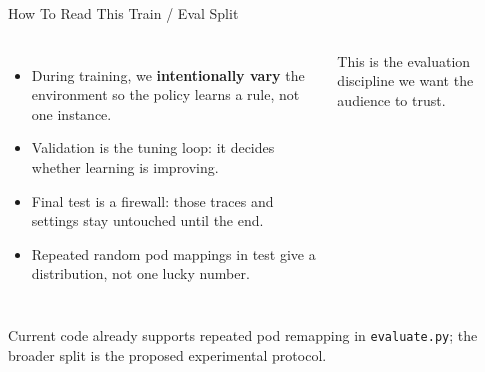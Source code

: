 \documentclass[10pt,aspectratio=169]{beamer}
\begin{document}
\begin{frame}{How To Read This Train / Eval Split}
  \begin{columns}[T,onlytextwidth]
      \centering
      \begin{itemize}
        \item During training, we \textbf{intentionally vary} the environment so the policy learns a rule, not one instance.
        \item Validation is the tuning loop: it decides whether learning is improving.
        \item Final test is a firewall: those traces and settings stay untouched until the end.
        \item Repeated random pod mappings in test give a distribution, not one lucky number.
      \end{itemize}

      \vspace{0.4em}
      {\scriptsize This is the evaluation discipline we want the audience to trust.}
  \end{columns}

  \vspace{0.2em}
  {\tiny Current code already supports repeated pod remapping in \texttt{evaluate.py}; the broader split is the proposed experimental protocol.}
\end{frame}
\end{document}
